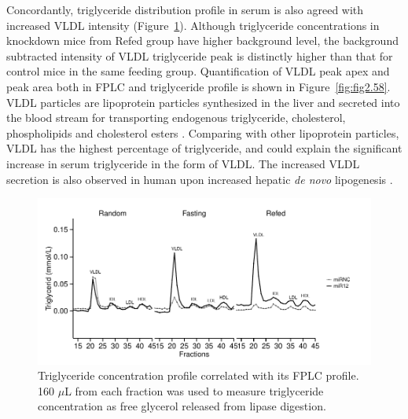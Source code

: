 Concordantly, triglyceride distribution profile in serum is also agreed with increased VLDL intensity (Figure~\ref{fig:fig2.40}). Although triglyceride concentrations in knockdown mice from Refed group have higher background level, the background subtracted intensity of VLDL triglyceride peak is distinctly higher than that for control mice in the same feeding group. Quantification of VLDL peak apex and peak area both in FPLC and triglyceride profile is shown in Figure~\ref{fig:fig2.58}. VLDL particles are lipoprotein particles synthesized in the liver and secreted into the blood stream for transporting endogenous triglyceride, cholesterol, phospholipids and cholesterol esters \cite{gibbons_synthesis_2004}. Comparing with other lipoprotein particles, VLDL has the highest percentage of triglyceride, and could explain the significant increase in serum triglyceride in the form of VLDL. The increased VLDL secretion is also observed in human upon increased hepatic \textit{de novo} lipogenesis \cite{schwarz_hepatic_2003}. 


\begin{figure}[htbp]
\centering
\includegraphics[width=1\textwidth]{figs/fig2-40 fplc_tag.pdf}
\caption[Triglyceride concentration in lipoprotein particles]{\footnotesize Triglyceride concentration profile correlated with its FPLC profile. 160 $\mu$L from each fraction was used to measure triglyceride concentration as free glycerol released from lipase digestion.}
\label{fig:fig2.40}
\end{figure}

